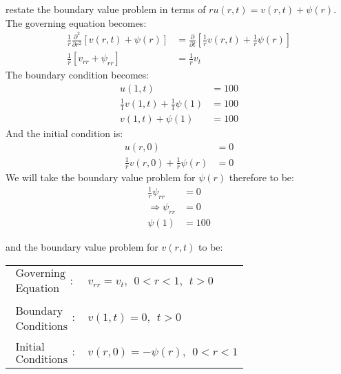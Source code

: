  restate the boundary value problem in terms of $ru(r,t)=v(r,t)+\psi(r)$. The governing equation becomes:
\begin{align*}
\frac{1}{r}\frac{\partial^2}{\partial r^2}\left[v(r,t) + \psi(r)\right] &= \frac{\partial}{\partial t}\left[\frac{1}{r}v(r,t) + \frac{1}{r}\psi(r)\right] \\
\frac{1}{r}\left[v_{rr} + \psi_{rr}\right] &= \frac{1}{r}v_t
\end{align*}
The boundary condition becomes:
\begin{align*}
u(1,t) &= 100 \\
\frac{1}{1}v(1,t) + \frac{1}{1}\psi(1) &= 100 \\
v(1,t) + \psi(1) &= 100
\end{align*} And the initial condition is:
\begin{align*}
u(r,0) &= 0 \\
\frac{1}{r}v(r,0) + \frac{1}{r}\psi(r) &= 0
\end{align*}
We will take the boundary value problem for $\psi(r)$ therefore to be:
\begin{align*}
\frac{1}{r}\psi_{rr} &= 0 \\
\Rightarrow \psi_{rr}&= 0 \\
\psi(1) &= 100
\end{align*}

\vspace{2.0cm}

\noindent and the boundary value problem for $v(r,t)$ to be:
\begin{table}[h]
\begin{tabular}{l l}
$\substack{\text{Governing} \\\text{Equation}}: $& $v_{rr} = v_t, \ \ 0<r<1, \ \ t>0$ \\
& \\
$\substack{\text{Boundary} \\ \text{Conditions}}: $& $v(1,t)=0, \ \ t>0$\\
& \\
$\substack{\text{Initial} \\ \text{Conditions}}: $ & $v(r,0) = -\psi(r), \ \ 0<r<1 $ \\
\end{tabular}
\end{table} 

\vspace{0.25cm}


